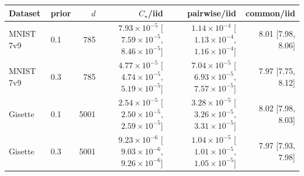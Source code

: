 \begin{tabular}{llrrrr}
\toprule
Dataset & prior & $d$ & $C_\star$/iid & pairwise/iid & common/iid \\
\midrule
MNIST 7v9 & 0.1 & 785 & $7.93\times 10^{-5}$ [$7.59\times 10^{-5}$, $8.46\times 10^{-5}$] & $1.14\times 10^{-4}$ [$1.13\times 10^{-4}$, $1.16\times 10^{-4}$] & 8.01 [7.98, 8.06] \\
MNIST 7v9 & 0.3 & 785 & $4.77\times 10^{-5}$ [$4.74\times 10^{-5}$, $5.19\times 10^{-5}$] & $7.04\times 10^{-5}$ [$6.93\times 10^{-5}$, $7.57\times 10^{-5}$] & 7.97 [7.75, 8.12] \\
Gisette & 0.1 & 5001 & $2.54\times 10^{-5}$ [$2.50\times 10^{-5}$, $2.59\times 10^{-5}$] & $3.28\times 10^{-5}$ [$3.26\times 10^{-5}$, $3.31\times 10^{-5}$] & 8.02 [7.98, 8.03] \\
Gisette & 0.3 & 5001 & $9.23\times 10^{-6}$ [$9.03\times 10^{-6}$, $9.26\times 10^{-6}$] & $1.04\times 10^{-5}$ [$1.01\times 10^{-5}$, $1.05\times 10^{-5}$] & 7.97 [7.93, 7.98] \\
\bottomrule
\end{tabular}
